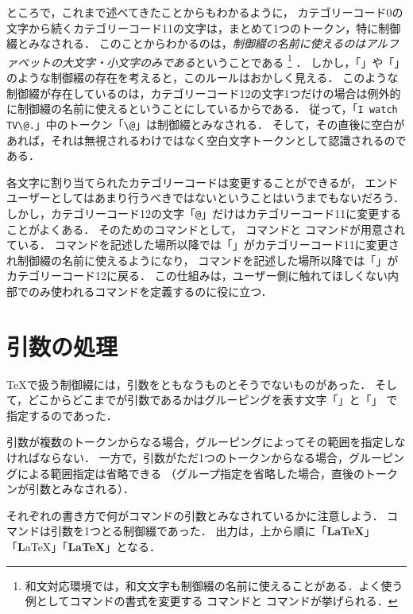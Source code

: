 ところで，これまで述べてきたことからもわかるように，
カテゴリーコード0の文字から続くカテゴリーコード11の文字は，まとめて1つのトークン，特に制御綴とみなされる．
このことからわかるのは，\emph{制御綴の名前に使えるのはアルファベットの大文字・小文字のみである}ということである%
\footnote{%
	和文対応環境では，和文文字も制御綴の名前に使えることがある．よく使う例としてコマンドの書式を変更する%
	コマンドと%
	コマンドが挙げられる．%
}%
．
しかし，「\cs{\#}」や「\cs{\$}」のような制御綴の存在を考えると，このルールはおかしく見える．
このような制御綴が存在しているのは，カテゴリーコード12の文字1つだけの場合は例外的に制御綴の名前に使えるということにしているからである．
従って，「\lstinline|I watch TV\@.|」中のトークン「\lstinline|\@|」は制御綴とみなされる．
そして，その直後に空白があれば，それは無視されるわけではなく空白文字トークンとして認識されるのである．

各文字に割り当てられたカテゴリーコードは変更することができるが，
エンドユーザーとしてはあまり行うべきではないということはいうまでもないだろう．
しかし，カテゴリーコード12の文字「\lstinline|@|」だけはカテゴリーコード11に変更することがよくある．
そのためのコマンドとして，%
%
コマンドと%
%
コマンドが用意されている．
コマンドを記述した場所以降では「」がカテゴリーコード11に変更され制御綴の名前に使えるようになり，
コマンドを記述した場所以降では「」がカテゴリーコード12に戻る．
この仕組みは，ユーザー側に触れてほしくない内部でのみ使われるコマンドを定義するのに役に立つ．

\section{引数の処理} \label{subsec:chap::simplemacro_sec::analysis_argument}

{\TeX}で扱う制御綴には，引数をともなうものとそうでないものがあった．
そして，どこからどこまでが引数であるかはグルーピングを表す文字「\cmd{\textbraceleft}」と「\cmd{\textbraceright}」
で指定するのであった．

引数が複数のトークンからなる場合，グルーピングによってその範囲を指定しなければならない．
一方で，引数がただ1つのトークンからなる場合，グルーピングによる範囲指定は省略できる
（グループ指定を省略した場合，直後のトークンが引数とみなされる）．

\begin{Ex} \label{Ex:chap::simplemacro_sec::analysis_subsec::argument_argument}
	それぞれの書き方で何がコマンドの引数とみなされているかに注意しよう．
	コマンドは引数を1つとる制御綴であった．
    出力は，上から順に「\textbf\LaTeX」「\textbf LaTeX」「\textbf{LaTeX}」となる．
\end{Ex}


